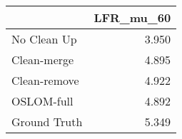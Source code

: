 \begin{tabular}{lr}
\toprule
{} & LFR_mu_60 \\
\midrule
No Clean Up  &     3.950 \\
Clean-merge  &     4.895 \\
Clean-remove &     4.922 \\
OSLOM-full   &     4.892 \\
Ground Truth &     5.349 \\
\bottomrule
\end{tabular}
